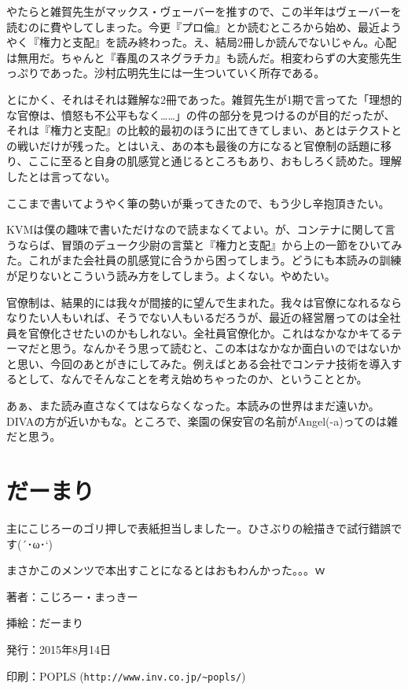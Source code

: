 ﻿\documentclass[9pt,b5paper,tombo,openany]{jsbook}
\begin{document}
やたらと雑賀先生がマックス・ヴェーバーを推すので、この半年はヴェーバーを読むのに費やしてしまった。今更『プロ倫』とか読むところから始め、最近ようやく『権力と支配』を読み終わった。え、結局2冊しか読んでないじゃん。心配は無用だ。ちゃんと『春風のスネグラチカ』も読んだ。相変わらずの大変態先生っぷりであった。沙村広明先生には一生ついていく所存である。

とにかく、それはそれは難解な2冊であった。雑賀先生が1期で言ってた「理想的な官僚は、憤怒も不公平もなく……」の件の部分を見つけるのが目的だったが、それは『権力と支配』の比較的最初のほうに出てきてしまい、あとはテクストとの戦いだけが残った。とはいえ、あの本も最後の方になると官僚制の話題に移り、ここに至ると自身の肌感覚と通じるところもあり、おもしろく読めた。理解したとは言ってない。

ここまで書いてようやく筆の勢いが乗ってきたので、もう少し辛抱頂きたい。

KVMは僕の趣味で書いただけなので読まなくてよい。が、コンテナに関して言うならば、冒頭のデューク少尉の言葉と『権力と支配』から上の一節をひいてみた。これがまた会社員の肌感覚に合うから困ってしまう。どうにも本読みの訓練が足りないとこういう読み方をしてしまう。よくない。やめたい。

官僚制は、結果的には我々が間接的に望んで生まれた。我々は官僚になれるならなりたい人もいれば、そうでない人もいるだろうが、最近の経営層ってのは全社員を官僚化させたいのかもしれない。全社員官僚化か。これはなかなかキてるテーマだと思う。なんかそう思って読むと、この本はなかなか面白いのではないかと思い、今回のあとがきにしてみた。例えばとある会社でコンテナ技術を導入するとして、なんでそんなことを考え始めちゃったのか、ということとか。

あぁ、また読み直さなくてはならなくなった。本読みの世界はまだ遠いか。DIVAの方が近いかもな。ところで、楽園の保安官の名前がAngel(-a)ってのは雑だと思う。

\section*{だーまり}
主にこじろーのゴリ押しで表紙担当しましたー。ひさぶりの絵描きで試行錯誤です(´･ω･`)

まさかこのメンツで本出すことになるとはおもわんかった。。。ｗ

\newpage

\thispagestyle{empty}
\begin{flushright}
\begin{minipage}{0.5\hsize}
\begin{description}
  \item{著者：}こじろー・まっきー
  \item{挿絵：}だーまり
  \item{発行：}2015年8月14日
  \item{印刷：}POPLS (\verb|http://www.inv.co.jp/~popls/|)
\end{description}
\end{minipage}
\end{flushright}
\end{document}
